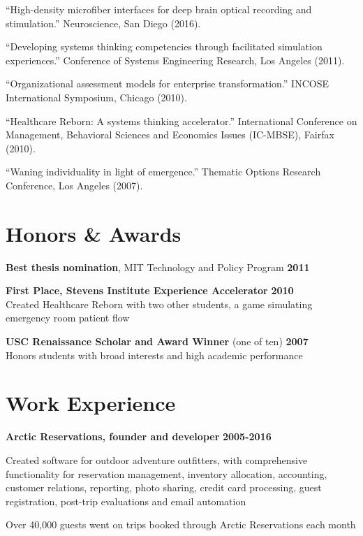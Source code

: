 \bigskip

\noindent
``High-density microfiber interfaces for deep brain optical recording and stimulation.'' Neuroscience, San Diego (2016).

\bigskip

\noindent
``Developing systems thinking competencies through facilitated simulation experiences.'' Conference of Systems Engineering Research, Los Angeles (2011).

\bigskip

\noindent
``Organizational assessment models for enterprise transformation.'' INCOSE International Symposium, Chicago (2010).

\bigskip

\noindent
``Healthcare Reborn: A systems thinking accelerator.'' International Conference on Management, Behavioral Sciences and Economics Issues (IC-MBSE), Fairfax (2010).

\bigskip

\noindent
``Waning individuality in light of emergence.'' Thematic Options Research Conference, Los Angeles (2007).

\section*{Honors \& Awards}

\textbf{Best thesis nomination}, MIT Technology and Policy Program \hfill \textbf{2011}

\noindent
\textbf{First Place, Stevens Institute Experience Accelerator} \hfill \textbf{2010} \\
	Created Healthcare Reborn with two other students, a game simulating emergency room patient flow

\noindent
\textbf{USC Renaissance Scholar and Award Winner} (one of ten) \hfill \textbf{2007} \\
	Honors students with broad interests and high academic performance

\section*{Work Experience} 

\textbf{Arctic Reservations, founder and developer} \hfill \textbf{2005-2016}
	
	\begin{list2}
		\item Created software for outdoor adventure outfitters, with comprehensive functionality for reservation management, inventory allocation, accounting, customer relations, reporting, photo sharing, credit card processing, guest registration, post-trip evaluations and email automation
	    \item Over 40,000 guests went on trips booked through Arctic Reservations each month
	\end{list2}

